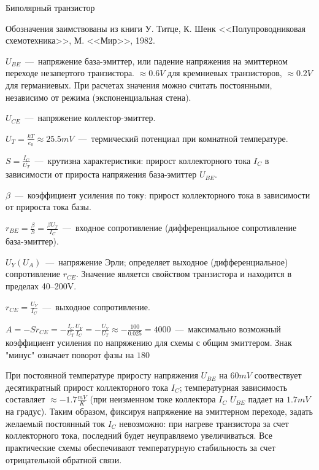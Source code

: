 \documentclass[
a4paper
,11pt
,landscape
,russian
,twocolumn
]{letter}
\begin{document}
\thispagestyle{empty}

\begin{Large}
Биполярный транзистор
\end{Large}

Обозначения заимствованы из книги У. Титце, К. Шенк <<Полупроводниковая
схемотехника>>, М. <<Мир>>, 1982.

$U_{BE}$~---~напряжение база-эмиттер, или падение напряжения на
эмиттерном переходе незапертого транзистора. $\approx 0.6V$ для
кремниевых транзисторов, $\approx 0.2V$ для германиевых. При расчетах
значения можно считать постоянными, независимо от режима
(экспоненциальная стена).

$U_{CE}$~---~напряжение коллектор-эмиттер.

$U_T=\frac{kT}{e_0}\approx 25.5mV$~---~термический потенциал при
комнатной температуре.

$S=\frac{I_C}{U_T}$~---~крутизна характеристики: прирост коллекторного
тока $I_C$ в зависимости от прироста напряжения база-эмиттер $U_{BE}$.

$\beta$~---~коэффициент усиления по току: прирост
коллекторного тока в зависимости от прироста тока базы.

$r_{BE}=\frac{\beta}{S}=\frac{\beta U_T}{I_C}$~---~входное сопротивление
(дифференциальное сопротивление база-эмиттер).

$U_Y(U_A)$~---~напряжение Эрли; определяет выходное (дифференциальное)
сопротивление $r_{CE}$. Значение является свойством транзистора и
находится в пределах 40--200V.

$r_{CE}=\frac{U_Y}{I_C}$~---~выходное сопротивление.

$A=-Sr_{CE}=-\frac{I_C}{U_T}\frac{U_Y}{I_C}=-\frac{U_Y}{U_T}
\approx-\frac{100}{0.025}=4000$~---~максимально возможный
коэффициент усиления по напряжению для схемы с общим эмиттером.
Знак "минус" означает поворот фазы на $180$

\vspace{.2in}

При постоянной температуре приросту напряжения $U_{BE}$ на $60mV$
соотвествует десятикратный прирост коллекторного тока $I_C$;
температурная зависимость составляет $\approx -1.7\frac{mV}{K}$
(при неизменном токе коллектора $I_C$ $U_{BE}$ падает на
$1.7mV$ на градус). Таким образом, фиксируя напряжение на
эмиттерном переходе, задать желаемый постоянный ток $I_C$
невозможно: при нагреве транзистора за счет коллекторного
тока, последний будет неуправляемо увеличиваться. Все практические
схемы обеспечивают температурную стабильность за счет
отрицательной обратной связи.
\end{document}
